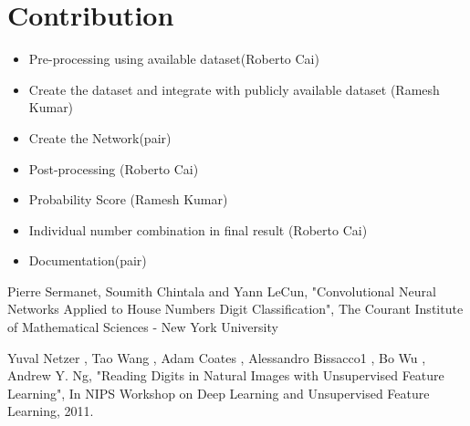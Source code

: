 \documentclass[12pt, letterpaper]{article}
\begin{document}
\section{Contribution}

\begin{itemize}
	\item Pre-processing using available dataset(Roberto Cai)
	\item Create the dataset and integrate with publicly available dataset (Ramesh Kumar)
	\item Create the Network(pair)
	\item Post-processing (Roberto Cai)
	\item Probability Score (Ramesh Kumar)
	\item Individual number combination in final result (Roberto Cai)
	\item Documentation(pair)
\end{itemize}

\begin{thebibliography}{9}
Pierre Sermanet, Soumith Chintala and Yann LeCun, "Convolutional Neural Networks Applied to
House Numbers Digit Classification", The Courant Institute of Mathematical Sciences - New York University 


Yuval Netzer
, Tao Wang
, Adam Coates
, Alessandro Bissacco1
, Bo Wu
, Andrew Y. Ng, "Reading Digits in Natural Images
with Unsupervised Feature Learning", In NIPS Workshop on Deep
Learning and Unsupervised Feature Learning, 2011.
\end{thebibliography} 
\end{document}
